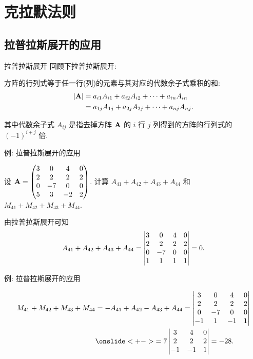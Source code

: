 \section{克拉默法则}

\subsection{拉普拉斯展开的应用}

\begin{frame}{拉普拉斯展开}
	\onslide<+->
	回顾下拉普拉斯展开:
	\begin{theorem}
		方阵的行列式等于任一行(列)的元素与其对应的代数余子式乘积的和:
		\begin{align*}
			|{\mathbf{A}}|&=a_{i1}A_{i1}+a_{i2}A_{i2}+\cdots+a_{in}A_{in}\\
			&=a_{1j}A_{1j}+a_{2j}A_{2j}+\cdots+a_{nj}A_{nj}.
		\end{align*}
	\end{theorem}
	\onslide<+->
	其中代数余子式 $A_{ij}$ 是指去掉方阵 ${\mathbf{A}}$ 的 $i$ 行 $j$ 列得到的方阵的行列式的 $(-1)^{i+j}$ 倍.
\end{frame}



\begin{frame}{例: 拉普拉斯展开的应用}
	\onslide<+->
	\begin{example}
		设 ${\mathbf{A}}=\begin{pmatrix}
			3&0&4&0\\
			2&2&2&2\\
			0&-7&0&0\\
			5&3&-2&2
		\end{pmatrix}$.
		计算 $A_{41}+A_{42}+A_{43}+A_{44}$ 和 $M_{41}+M_{42}+M_{43}+M_{44}$.
	\end{example}
	\onslide<+->
	\begin{solution}
		由拉普拉斯展开可知
		\[A_{41}+A_{42}+A_{43}+A_{44}
		=\left|\begin{matrix}
			3&0&4&0\\
			2&2&2&2\\
			0&-7&0&0\\
			1&1&1&1
		\end{matrix}\right|=0.\]
	\end{solution}
\end{frame}


\begin{frame}{例: 拉普拉斯展开的应用}
	\onslide<+->
		\begin{solutionc}
			\begin{align*}
				M_{41}+M_{42}+M_{43}+M_{44}
				&=-A_{41}+A_{42}-A_{43}+A_{44}
				=\detm{
					3&0&4&0\\
					2&2&2&2\\
					0&-7&0&0\\
					-1&1&-1&1
				}\\
				&\onslide<+->{
					=7\detm{
						3&4&0\\
						2&2&2\\
						-1&-1&1
				}=-28.}
		\end{align*}
	\end{solutionc}
\end{frame}


